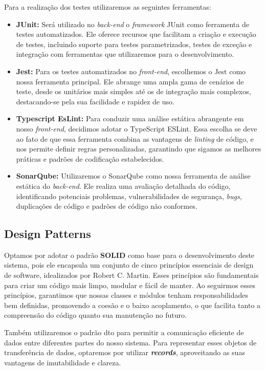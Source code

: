 Para a realização dos testes utilizaremos as seguintes ferramentas:
 
\begin{itemize}
    \item \textbf{JUnit:}
     Será utilizado no \textit{back-end} o \textit{framework} JUnit como ferramenta de testes automatizados. Ele oferece recursos que facilitam a criação e execução de testes, incluindo suporte para testes parametrizados, testes de exceção e integração com ferramentas que utilizaremos para o desenvolvimento.
    \item \textbf{Jest:}
    Para os testes automatizados no \textit{front-end}, escolhemos o Jest como nossa ferramenta principal. Ele abrange uma ampla gama de cenários de teste, desde os unitários mais simples até os de integração mais complexos, destacando-se pela sua facilidade e rapidez de uso. 
    \item \textbf{Typescript EsLint:}
    Para conduzir uma análise estática abrangente em nosso \textit{front-end}, decidimos adotar o TypeScript ESLint. Essa escolha se deve ao fato de que essa ferramenta combina as vantagens de \textit{linting} de código, e nos permite definir regras personalizadas, garantindo que sigamos as melhores práticas e padrões de codificação estabelecidos.
    \item \textbf{SonarQube:}
    Utilizaremos o SonarQube como nossa ferramenta de análise estática do \textit{back-end}. Ele realiza uma avaliação detalhada do código, identificando potenciais problemas, vulnerabilidades de segurança, \textit{bugs}, duplicações de código e padrões de código não conformes.
\end{itemize}
\subsection{Design Patterns}
Optamos por adotar o padrão \textbf{SOLID} como base para o desenvolvimento deste sistema, pois ele encapsula um conjunto de cinco princípios essenciais de design de software, idealizados por Robert C. Martin. Esses princípios são fundamentais para criar um código mais limpo, modular e fácil de manter. Ao seguirmos esses princípios, garantimos que nossas classes e módulos tenham responsabilidades bem definidas, promovendo a coesão e o baixo acoplamento, o que facilita tanto a compreensão do código quanto sua manutenção no futuro. 

Também utilizaremos o padrão \ac{dto} para permitir a comunicação eficiente de dados entre diferentes partes do nosso sistema. Para representar esses objetos de transferência de dados, optaremos por utilizar \textit{\textbf{records}}, aproveitando as suas vantagens de imutabilidade e clareza.

